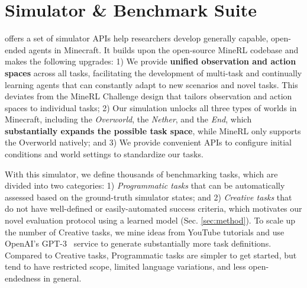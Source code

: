 
\section{\minedojo Simulator \& Benchmark Suite}
\label{sec:benchmark}
\minedojo offers a set of simulator APIs help researchers develop generally capable, open-ended agents in Minecraft. 
It builds upon the open-source MineRL codebase \cite{guss2019minerl} and makes the following upgrades: 
1) We provide \textbf{unified observation and action spaces} across all tasks, facilitating the development of multi-task and continually learning agents that can constantly adapt to new scenarios and novel tasks. This deviates from the MineRL Challenge design that tailors observation and action spaces to individual tasks;
2) Our simulation unlocks all three types of worlds in Minecraft, including the \textit{Overworld}, the \textit{Nether}, and the \textit{End}, which \textbf{substantially expands the possible task space}, while MineRL only supports the Overworld natively; and 3) We provide convenient APIs to configure initial conditions and world settings to standardize our tasks. 

With this \minedojo simulator, we define thousands of benchmarking tasks, which are divided into two categories: 1) \textit{Programmatic tasks} that can be automatically assessed based on the ground-truth simulator states; 
and 2) \textit{Creative tasks} that do not have well-defined or easily-automated success criteria, which motivates our novel evaluation protocol using a learned model (Sec. \ref{sec:method}). 
To scale up the number of Creative tasks, we mine ideas from YouTube tutorials and use OpenAI's GPT-3~\cite{brown2020gpt3} service to generate substantially more task definitions. 
Compared to Creative tasks, Programmatic tasks are simpler to get started, but tend to have restricted scope, limited language variations, and less open-endedness in general.

